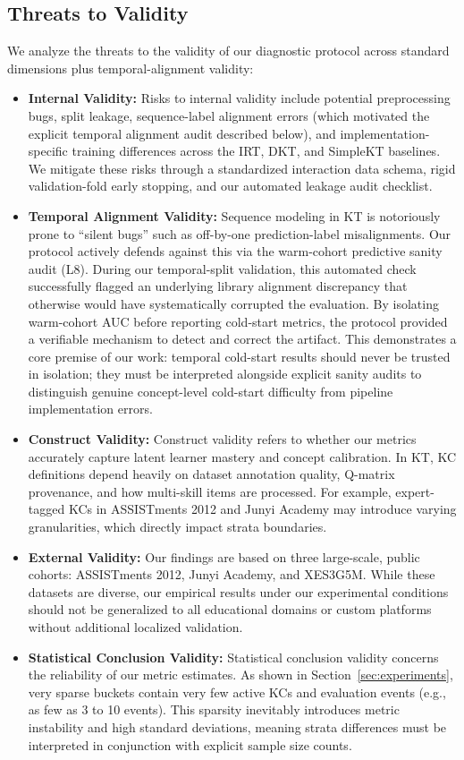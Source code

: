 \subsection{Threats to Validity}
\label{sec:threats}
We analyze the threats to the validity of our diagnostic protocol across standard dimensions plus temporal-alignment validity:
\begin{itemize}
    \item \textbf{Internal Validity:} Risks to internal validity include potential preprocessing bugs, split leakage, sequence-label alignment errors (which motivated the explicit temporal alignment audit described below), and implementation-specific training differences across the IRT, DKT, and SimpleKT baselines. We mitigate these risks through a standardized interaction data schema, rigid validation-fold early stopping, and our automated leakage audit checklist.
    \item \textbf{Temporal Alignment Validity:} Sequence modeling in KT is notoriously prone to ``silent bugs'' such as off-by-one prediction-label misalignments. Our protocol actively defends against this via the warm-cohort predictive sanity audit (L8). During our temporal-split validation, this automated check successfully flagged an underlying library alignment discrepancy that otherwise would have systematically corrupted the evaluation. By isolating warm-cohort AUC before reporting cold-start metrics, the protocol provided a verifiable mechanism to detect and correct the artifact. This demonstrates a core premise of our work: temporal cold-start results should never be trusted in isolation; they must be interpreted alongside explicit sanity audits to distinguish genuine concept-level cold-start difficulty from pipeline implementation errors.
    \item \textbf{Construct Validity:} Construct validity refers to whether our metrics accurately capture latent learner mastery and concept calibration. In KT, KC definitions depend heavily on dataset annotation quality, Q-matrix provenance, and how multi-skill items are processed. For example, expert-tagged KCs in ASSISTments 2012 and Junyi Academy may introduce varying granularities, which directly impact strata boundaries.
    \item \textbf{External Validity:} Our findings are based on three large-scale, public cohorts: ASSISTments 2012, Junyi Academy, and XES3G5M. While these datasets are diverse, our empirical results under our experimental conditions should not be generalized to all educational domains or custom platforms without additional localized validation.
    \item \textbf{Statistical Conclusion Validity:} Statistical conclusion validity concerns the reliability of our metric estimates. As shown in Section~\ref{sec:experiments}, very sparse buckets contain very few active KCs and evaluation events (e.g., as few as 3 to 10 events). This sparsity inevitably introduces metric instability and high standard deviations, meaning strata differences must be interpreted in conjunction with explicit sample size counts.
\end{itemize}
